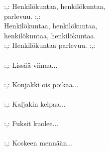 
:,: Henkilökuntaa, henkilökuntaa, \\ parlevuu. :,: \\ Henkilökuntaa, henkilökuntaa, \\ henkilökuntaa, henkilökuntaa. \\ :,: Henkilökuntaa parlevuu. :,: \\ \hspace{10mm} \\ :,: Lissää viinaa... \\ \hspace{10mm} \\ :,: Konjakki ois poikaa... \\ \hspace{10mm} \\ :,: Kaljakin kelpaa... \\ \hspace{10mm} \\ :,: Fuksit kuolee... \\ \hspace{10mm} \\ :,: Koskeen mennään...
